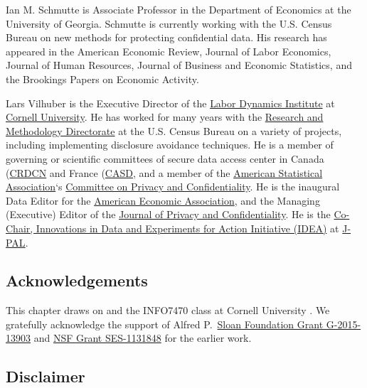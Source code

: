 \documentclass[
]{WileySix}
\begin{document}
Ian M. Schmutte is Associate Professor in the Department of Economics at the University of Georgia. Schmutte is currently working with the U.S. Census Bureau on new methods for protecting confidential data. His research has appeared in the American Economic Review, Journal of Labor Economics, Journal of Human Resources, Journal of Business and Economic Statistics, and the Brookings Papers on Economic Activity.

Lars Vilhuber is the Executive Director of the \href{http://www.ilr.cornell.edu/ldi}{Labor Dynamics Institute} at \href{http://www.cornell.edu}{Cornell University}. He has worked for many years with the \href{https://www.census.gov/research/}{Research and Methodology Directorate} at the U.S. Census Bureau on a variety of projects, including implementing disclosure avoidance techniques. He is a member of governing or scientific committees of secure data access center in Canada (\href{https://crdcn.org/}{CRDCN} and France (\href{http://casd.eu}{CASD}, and a member of the \href{https://www.amstat.org/}{American Statistical Association}`s \href{https://community.amstat.org/cpc/home}{Committee on Privacy and Confidentiality}. He is the inaugural Data Editor for the \href{https://www.aeaweb.org/}{American Economic Association}, and the Managing (Executive) Editor of the \href{https://journalprivacyconfidentiality.org/}{Journal of Privacy and Confidentiality}. He is the \href{https://www.povertyactionlab.org/initiative/innovations-data-experiments-action}{Co-Chair, Innovations in Data and Experiments for Action Initiative (IDEA)} at \href{https://www.povertyactionlab.org/}{J-PAL}.

\hypertarget{acknowledgements}{%
\subsection*{Acknowledgements}\label{acknowledgements}}

This chapter draws on \citet{abowd_introductory_2019} and the INFO7470 class at Cornell University \citep{abowd_session_2016}. We gratefully acknowledge the support of Alfred P.~\href{https://sloan.org/grant-detail/6845}{Sloan Foundation Grant G-2015-13903} and \href{http://www.nsf.gov/awardsearch/showAward.do?AwardNumber=1131848}{NSF Grant SES-1131848} for the earlier work.

\hypertarget{disclaimer}{%
\subsection*{Disclaimer}\label{disclaimer}}
\end{document}
